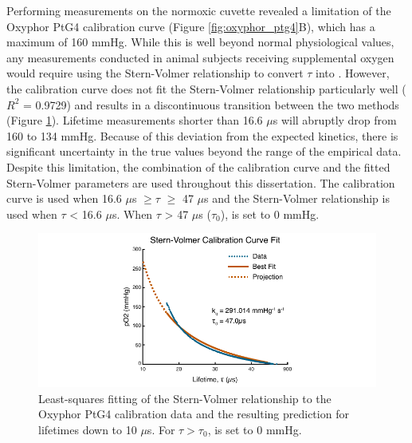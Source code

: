 Performing measurements on the normoxic cuvette revealed a limitation of the Oxyphor PtG4 calibration curve (Figure \ref{fig:oxyphor_ptg4}B), which has a maximum  of 160 mmHg. While this is well beyond normal physiological values, any measurements conducted in animal subjects receiving supplemental oxygen would require using the Stern-Volmer relationship to convert $\tau$ into . However, the calibration curve does not fit the Stern-Volmer relationship particularly well ($R^2$ = 0.9729) and results in a discontinuous transition between the two methods (Figure \ref{fig:sternvolmerfit}). Lifetime measurements shorter than 16.6 $\mu$s will abruptly drop from 160 to 134 mmHg. Because of this deviation from the expected kinetics, there is significant uncertainty in the true  values beyond the range of the empirical data. Despite this limitation, the combination of the calibration curve and the fitted Stern-Volmer parameters are used throughout this dissertation. The calibration curve is used when 16.6 $\mu$s $\ge \tau$ $\ge$ 47 $\mu$s and the Stern-Volmer relationship is used when $\tau$ \textless{} 16.6 $\mu$s. When $\tau$ \textgreater{} 47 $\mu$s ($\tau_0$),  is set to 0 mmHg.

\begin{figure}
    \includegraphics{figures/chapter_2/sternvolmerfit.pdf}
    \caption{
        \label{fig:sternvolmerfit}
        Least-squares fitting of the Stern-Volmer relationship to the Oxyphor PtG4 calibration data and the resulting prediction for lifetimes down to 10 $\mu$s. For $\tau > \tau_0$,  is set to 0 mmHg.
    }
\end{figure}



